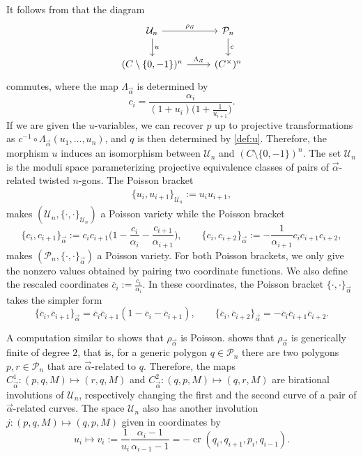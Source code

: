 \documentclass[10pt,a4paper]{amsart}
\numberwithin{equation}{section}
\newcommand{\C}{{\mathbb C}}
\newcommand{\be}{\begin{equation}}
\newcommand{\ee}{\end{equation}}
\newcommand{\la}{\label}
\def\cro{\operatorname{cr}}
\def\C{C}
\begin{document}
	
	It follows from \cite[Section 4.8]{AFIT} that the diagram
	\[
	\begin{tikzcd}
		\mathcal U_n \arrow[r, "\rho_{\vec \alpha}"] \arrow[d, "u"]
		& \mathcal P_n \arrow[d, "c"] \\
		(\C\setminus\{0,-1\})^n \arrow[r,"\Lambda_{\vec{\alpha}}"]
		& (\C^\times)^n
	\end{tikzcd}
	\]
	commutes, where the map $\Lambda_{\vec{\alpha}}$ is determined by
	\[
		c_i = \frac{\alpha_i}{(1+u_i)\big(1+\frac 1 {u_{i+1}}\big)}.
	\]
	If we are given the $u$-variables, we can recover $p$ up to projective transformations as $c^{-1} \circ \Lambda_{\vec \alpha}(u_1,\dots,u_n)$, and $q$ is then determined by \eqref{def:u}. Therefore, the morphism $u$ induces an isomorphism between $\mathcal U_n$ and $(\C \setminus \{0,-1\})^n$. The set $\mathcal U_n$ is the moduli space parameterizing projective equivalence classes of pairs of $\vec \alpha$-related twisted $n$-gons. The Poisson bracket
	\begin{align}
		\{u_i,u_{i+1}\}_{\mathcal U_n}:=u_i u_{i+1}, \label{eq:upoisson}
	\end{align}
	makes $(\mathcal U_n,\{\cdot, \cdot\}_{\mathcal U_n})$ a Poisson variety while the Poisson bracket
	\[
	\{c_i,c_{i+1}\}_{\vec \alpha} := c_i c_{i+1} \biggl(1-\frac{c_i}{\alpha_i}-\frac{c_{i+1}}{\alpha_{i+1}}\biggr), \qquad
	\{c_i,c_{i+2}\}_{\vec{\alpha}} := -\frac{1}{\alpha_{i+1}}c_i c_{i+1} c_{i+2},
	\]
	makes $(\mathcal P_n,\{\cdot,\cdot\}_{\vec{\alpha}})$ a Poisson variety. For both Poisson brackets, we only give the nonzero values obtained by pairing two coordinate functions. We also define the rescaled coordinates $\overline{c}_i:=\frac{c_i}{\alpha_i}$. In these coordinates, the Poisson bracket $\{\cdot,\cdot\}_{\vec \alpha}$ takes the simpler form
	\[
	\{\overline c_i, \overline c_{i+1}\}_{\vec \alpha} = \overline c_i \overline c_{i+1} \left(1-\overline{c}_i-\overline{c}_{i+1}\right), \qquad
	\{\overline c_i,\overline c_{i+2}\}_{\vec \alpha} = -\overline c_i \overline c_{i+1} \overline c_{i+2}.
	\]
	
	
	A computation similar to \cite[Lemma 4.9]{AFIT} shows that $\rho_{\vec \alpha}$ is Poisson. \cite[Corollary 2.7]{AFIT} shows that $\rho_{\vec \alpha}$ is generically finite of degree $2$, that is, for a generic polygon $q \in \mathcal P_n$ there are two polygons $p,r \in \mathcal P_n$ that are ${\vec \alpha}$-related to $q$. Therefore, the maps $C^1_{\vec \alpha}\colon (p,q,M) \mapsto (r,q,M)$ and $C^2_{\vec \alpha}\colon (q,p,M) \mapsto (q,r,M)$ are birational involutions of $\mathcal U_n$, respectively changing the first and the second curve of a pair of $\vec \alpha$-related curves. The space $\mathcal U_n$ also has another involution $j\colon (p,q,M) \mapsto (q,p,M)$ given in coordinates by
\be \la{eq:uv}
	u_i \mapsto v_i:= \frac{1}{u_i} \frac{\alpha_i-1}{\alpha_{i-1}-1}= -\cro(q_i,q_{i+1},p_i,q_{i-1}).
\ee
	
\end{document}
